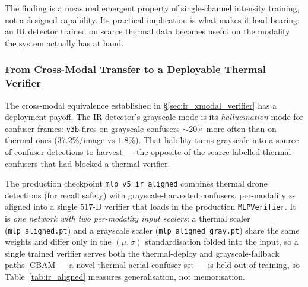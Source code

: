 The finding is a measured emergent property of single-channel intensity training, not a designed capability. Its practical implication is what makes it load-bearing: an IR detector trained on scarce thermal data becomes useful on the modality the system actually has at hand.

\subsubsection{From Cross-Modal Transfer to a Deployable Thermal Verifier}
\label{sec:grayscale_verifier}

The cross-modal equivalence established in \S\ref{sec:ir_xmodal_verifier} has a deployment payoff. The IR detector's grayscale mode is its \emph{hallucination} mode for confuser frames: \texttt{v3b} fires on grayscale confusers $\sim$20$\times$ more often than on thermal ones ($37.2\%$/image vs $1.8\%$). That liability turns grayscale into a source of confuser detections to harvest --- the opposite of the scarce labelled thermal confusers that had blocked a thermal verifier.

The production checkpoint \texttt{mlp\_v5\_ir\_aligned} combines thermal drone detections (for recall safety) with grayscale-harvested confusers, per-modality z-aligned into a single $517$-D verifier that loads in the production \texttt{MLPVerifier}. It is \emph{one network with two per-modality input scalers}: a thermal scaler (\texttt{mlp\_aligned.pt}) and a grayscale scaler (\texttt{mlp\_aligned\_gray.pt}) share the same weights and differ only in the $(\mu,\sigma)$ standardisation folded into the input, so a single trained verifier serves both the thermal-deploy and grayscale-fallback paths. CBAM --- a novel thermal aerial-confuser set --- is held out of training, so Table~\ref{tab:ir_aligned} measures generalisation, not memorisation.

